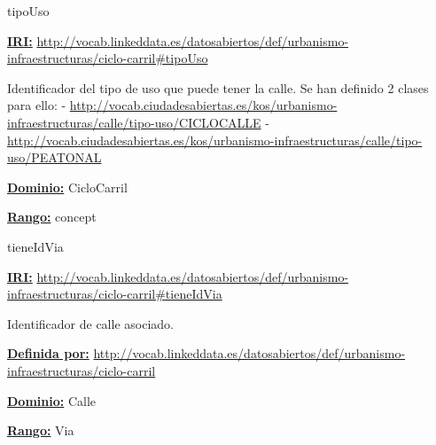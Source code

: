 \begin{mybox}{tipoUso}
\begin{flushleft}
\underline{\textbf{IRI:}}
\url{http://vocab.linkeddata.es/datosabiertos/def/urbanismo-infraestructuras/ciclo-carril#tipoUso}
\newline

Identificador del tipo de uso que puede tener la calle. Se han definido 2 clases para ello:
\newline -	\url{http://vocab.ciudadesabiertas.es/kos/urbanismo-infraestructuras/calle/tipo-uso/CICLOCALLE}
\newline -	 \url{http://vocab.ciudadesabiertas.es/kos/urbanismo-infraestructuras/calle/tipo-uso/PEATONAL}
\newline



\underline{\textbf{Dominio:}}
\newline CicloCarril

\underline{\textbf{Rango:}}
		concept


\end{flushleft}
\end{mybox}






\begin{mybox}{tieneIdVia}
\begin{flushleft}
\underline{\textbf{IRI:}}
\url{http://vocab.linkeddata.es/datosabiertos/def/urbanismo-infraestructuras/ciclo-carril#tieneIdVia}
\newline

Identificador de calle asociado.
\newline

\underline{\textbf{Definida por:}}
\url{http://vocab.linkeddata.es/datosabiertos/def/urbanismo-infraestructuras/ciclo-carril}
\newline

\underline{\textbf{Dominio:}}
		Calle
\newline

\underline{\textbf{Rango:}}
		Via
\newline


\end{flushleft}
\end{mybox}





